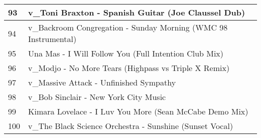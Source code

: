 \begin{appendices}
\begin{longtable}{| p{} | p{} |}
\hline
93 & v{\_}Toni Braxton - Spanish Guitar (Joe Claussel Dub)\\
\hline 
94 & v{\_}Backroom Congregation - Sunday Morning (WMC 98 Instrumental)\\
\hline
95 & Una Mas - I Will Follow You (Full Intention Club Mix)\\
\hline
96 & v{\_}Modjo - No More Tears (Highpass vs Triple X Remix)\\
\hline
97 & v{\_}Massive Attack - Unfinished Sympathy\\
\hline
98 & v{\_}Bob Sinclair - New York City Music\\
\hline
99 & Kimara Lovelace - I Luv You More (Sean McCabe Demo Mix)\\
\hline
100 & v{\_}The Black Science Orchestra - Sunshine (Sunset Vocal)\\
\hline
\end{longtable}
\clearpage

\end{appendices}
